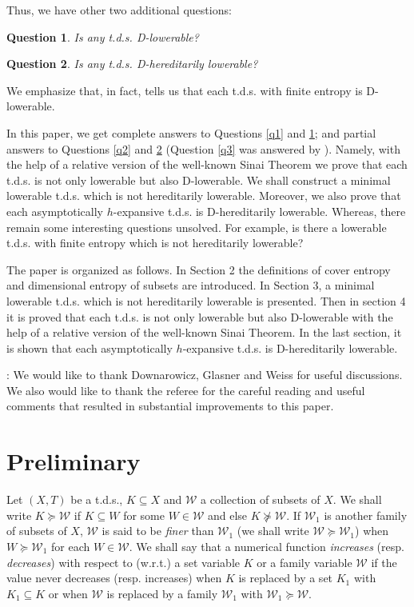 \documentclass[12pt]{amsart}
\newtheorem{ques}{Question}
\theoremstyle{definition} \theoremstyle{question}
\numberwithin{equation}{section}
\begin{document}
\noindent Thus, we have other two additional questions:

\begin{ques} \label{q4}
Is any t.d.s. D-lowerable?
\end{ques}

\begin{ques} \label{q5}
Is any t.d.s. D-hereditarily lowerable?
\end{ques}

We emphasize that, in fact, \cite[Theorem 4.4]{HYZ1} tells
us that each t.d.s. with finite entropy is D-lowerable.

In this paper, we get complete answers to Questions \ref{q1} and
\ref{q4}; and partial answers to Questions \ref{q2} and \ref{q5}
(Question \ref{q3} was answered by \cite[Theorem 7.7]{HYZ1}). Namely, with the
help of a relative version of the well-known Sinai Theorem we prove
that each t.d.s. is not only lowerable but also D-lowerable. We
shall construct a minimal lowerable t.d.s. which is not hereditarily
lowerable. Moreover, we also prove that each asymptotically
$h$-expansive t.d.s. is D-hereditarily lowerable. Whereas, there
remain some interesting questions unsolved. For example, is there a
lowerable t.d.s. with finite entropy which is not hereditarily
lowerable?

The paper is organized as follows. In Section 2 the definitions of
cover entropy and dimensional entropy of subsets are introduced. In
Section 3, a minimal lowerable t.d.s. which is not hereditarily
lowerable is presented.
Then in section 4 it is proved that each t.d.s. is not only
lowerable but also D-lowerable with the help of a relative version
of the well-known Sinai Theorem. In the last section, it is shown
that each asymptotically $h$-expansive t.d.s. is D-hereditarily
lowerable.

\medskip
{}: We would like to thank Downarowicz,
Glasner and Weiss for useful discussions. We also would like to thank the referee for the careful reading
and useful comments that resulted in substantial improvements to this paper.

\section{Preliminary}

Let $(X, T)$ be a  t.d.s., $K\subseteq X$ and $\mathcal{W}$ a
collection of subsets of $X$. We shall write $K\succeq \mathcal{W}$
if $K\subseteq W$ for some $W\in \mathcal{W}$ and else $K\nsucceq
\mathcal{W}$. If $\mathcal{W}_1$ is another family of subsets of
$X$, $\mathcal{W}$ is said to be {\it finer} than $\mathcal{W}_1$
(we shall write $\mathcal{W}\succeq \mathcal{W}_1$) when $W\succeq
\mathcal{W}_1$ for each $W\in \mathcal{W}$. We shall say that a
numerical function {\it increases} (resp. {\it decreases}) with
respect to (w.r.t.) a set variable $K$ or a family variable
$\mathcal{W}$ if the value never decreases (resp. increases) when
$K$ is replaced by a set $K_1$ with $K_1\subseteq K$ or when
$\mathcal{W}$ is replaced by a family $\mathcal{W}_1$ with
$\mathcal{W}_1\succeq \mathcal{W}$.
\end{document}
